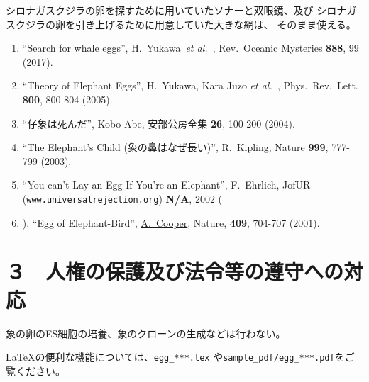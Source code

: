 \documentclass[11pt,a4j,dvipdfmx]{jarticle} 					%
\newcommand{\研究課題名}{象の卵}
\newcommand{\研究機関名}{逢坂大学}
\newcommand{\研究代表者氏名}{湯川秀樹}
\newcommand{\研究期間の最終元号年度}{9}  %
\newcommand{\paper}[6]{%
	\item ``#1'', #2, #3 {\bf #4}, #5 (#6).			%
}
\newcommand{\etal}{\textit{et al.\ }}
\newcommand{\yukawa}{H.~Yukawa}					%
\newcommand{\prl}{Phys.\ Rev.\ Lett.\ }		%
\begin{document}
	シロナガスクジラの卵を探すために用いていたソナーと双眼鏡、及び
	シロナガスクジラの卵を引き上げるために用意していた大きな網は、
	そのまま使える。
	\begin{enumerate}
		\paper{Search for whale eggs}{\yukawa\ \etal}{Rev.\ Oceanic Mysteries}{888}{99}{2017}
			\label{pub:whale}
				
		\paper{Theory of Elephant Eggs}{\yukawa, Kara Juzo \etal}{\prl}{800}{800-804}{2005}
			\label{pub:theoegg}
				
		\paper{仔象は死んだ}{Kobo Abe}{安部公房全集}{26}{100-200}{2004}
		
		\paper{The Elephant's Child (象の鼻はなぜ長い)}{R.~Kipling}{Nature}{999}{777-799}{2003}

		\paper{You can't Lay an Egg If You're an Elephant}{F.~Ehrlich}
			{JofUR\\({\tt www.universalrejection.org})}{{\bf N/A}}{2002}
		
		\item ``Egg of Elephant-Bird'', 
				\underline{A.~Cooper},
				Nature, {\bf 409}, 704-707 (2001).	%
	\end{enumerate}




\section{３　人権の保護及び法令等の遵守への対応}

	象の卵のES細胞の培養、象のクローンの生成などは行わない。

	\LaTeX の便利な機能については、\texttt{egg\_***.tex} や\texttt{sample\_pdf/egg\_***.pdf}をご覧ください。



\end{document}
